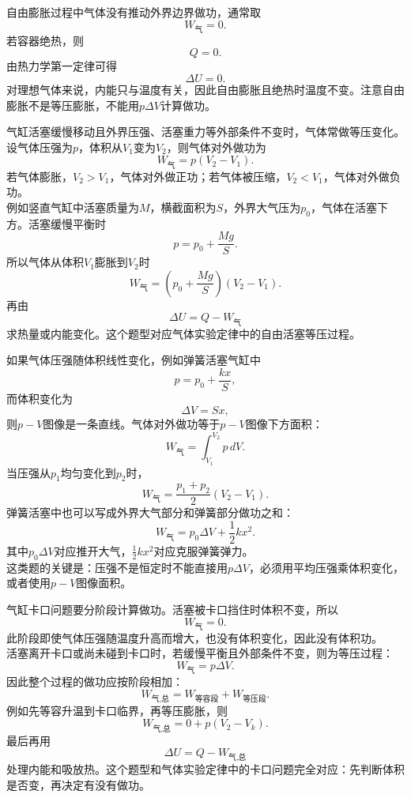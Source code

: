 \begin{casetypebox}[title={\strut\textcolor{white}{\bfseries 常见题型：自由膨胀}}]
  自由膨胀过程中气体没有推动外界边界做功，通常取
  \[
    W_{\text{气}}=0.
  \]
  若容器绝热，则
  \[
    Q=0.
  \]
  由热力学第一定律可得
  \[
    \Delta U=0.
  \]
  对理想气体来说，内能只与温度有关，因此自由膨胀且绝热时温度不变。注意自由膨胀不是等压膨胀，不能用$p\Delta V$计算做功。
\end{casetypebox}

\begin{casetypebox}[title={\strut\textcolor{white}{\bfseries 常见题型：气缸等压变化做功}}]
  气缸活塞缓慢移动且外界压强、活塞重力等外部条件不变时，气体常做等压变化。设气体压强为$p$，体积从$V_1$变为$V_2$，则气体对外做功为
  \[
    W_{\text{气}}=p(V_2-V_1).
  \]
  若气体膨胀，$V_2>V_1$，气体对外做正功；若气体被压缩，$V_2<V_1$，气体对外做负功。\\
  例如竖直气缸中活塞质量为$M$，横截面积为$S$，外界大气压为$p_0$，气体在活塞下方。活塞缓慢平衡时
  \[
    p=p_0+\frac{Mg}{S}.
  \]
  所以气体从体积$V_1$膨胀到$V_2$时
  \[
    W_{\text{气}}=\left(p_0+\frac{Mg}{S}\right)(V_2-V_1).
  \]
  再由
  \[
    \Delta U=Q-W_{\text{气}}
  \]
  求热量或内能变化。这个题型对应气体实验定律中的自由活塞等压过程。
\end{casetypebox}

\begin{casetypebox}[title={\strut\textcolor{white}{\bfseries 常见题型：压强均匀变化做功}}]
  如果气体压强随体积线性变化，例如弹簧活塞气缸中
  \[
    p=p_0+\frac{kx}{S},
  \]
  而体积变化为
  \[
    \Delta V=Sx,
  \]
  则$p-V$图像是一条直线。气体对外做功等于$p-V$图像下方面积：
  \[
    W_{\text{气}}=\int_{V_1}^{V_2}p\,dV.
  \]
  当压强从$p_1$均匀变化到$p_2$时，
  \[
    W_{\text{气}}=\frac{p_1+p_2}{2}(V_2-V_1).
  \]
  弹簧活塞中也可以写成外界大气部分和弹簧部分做功之和：
  \[
    W_{\text{气}}=p_0\Delta V+\frac12kx^2.
  \]
  其中$p_0\Delta V$对应推开大气，$\frac12kx^2$对应克服弹簧弹力。\\
  这类题的关键是：压强不是恒定时不能直接用$p\Delta V$，必须用平均压强乘体积变化，或者使用$p-V$图像面积。
\end{casetypebox}

\begin{casetypebox}[title={\strut\textcolor{white}{\bfseries 常见题型：卡口气缸的分段做功}}]
  气缸卡口问题要分阶段计算做功。活塞被卡口挡住时体积不变，所以
  \[
    W_{\text{气}}=0.
  \]
  此阶段即使气体压强随温度升高而增大，也没有体积变化，因此没有体积功。\\
  活塞离开卡口或尚未碰到卡口时，若缓慢平衡且外部条件不变，则为等压过程：
  \[
    W_{\text{气}}=p\Delta V.
  \]
  因此整个过程的做功应按阶段相加：
  \[
    W_{\text{气,总}}=W_{\text{等容段}}+W_{\text{等压段}}.
  \]
  例如先等容升温到卡口临界，再等压膨胀，则
  \[
    W_{\text{气,总}}=0+p(V_2-V_k).
  \]
  最后再用
  \[
    \Delta U=Q-W_{\text{气,总}}
  \]
  处理内能和吸放热。这个题型和气体实验定律中的卡口问题完全对应：先判断体积是否变，再决定有没有做功。
\end{casetypebox}

